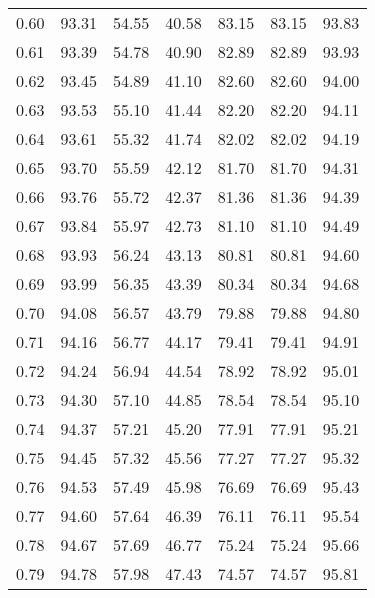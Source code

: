 \begin{tabular}{|c|c|c|c|c|c|c|}
      0.60 &     93.31 &     54.55 &      40.58 &   83.15 &      83.15 &         93.83 \\
      0.61 &     93.39 &     54.78 &      40.90 &   82.89 &      82.89 &         93.93 \\
      0.62 &     93.45 &     54.89 &      41.10 &   82.60 &      82.60 &         94.00 \\
      0.63 &     93.53 &     55.10 &      41.44 &   82.20 &      82.20 &         94.11 \\
      0.64 &     93.61 &     55.32 &      41.74 &   82.02 &      82.02 &         94.19 \\
      0.65 &     93.70 &     55.59 &      42.12 &   81.70 &      81.70 &         94.31 \\
      0.66 &     93.76 &     55.72 &      42.37 &   81.36 &      81.36 &         94.39 \\
      0.67 &     93.84 &     55.97 &      42.73 &   81.10 &      81.10 &         94.49 \\
      0.68 &     93.93 &     56.24 &      43.13 &   80.81 &      80.81 &         94.60 \\
      0.69 &     93.99 &     56.35 &      43.39 &   80.34 &      80.34 &         94.68 \\
      0.70 &     94.08 &     56.57 &      43.79 &   79.88 &      79.88 &         94.80 \\
      0.71 &     94.16 &     56.77 &      44.17 &   79.41 &      79.41 &         94.91 \\
      0.72 &     94.24 &     56.94 &      44.54 &   78.92 &      78.92 &         95.01 \\
      0.73 &     94.30 &     57.10 &      44.85 &   78.54 &      78.54 &         95.10 \\
      0.74 &     94.37 &     57.21 &      45.20 &   77.91 &      77.91 &         95.21 \\
      0.75 &     94.45 &     57.32 &      45.56 &   77.27 &      77.27 &         95.32 \\
      0.76 &     94.53 &     57.49 &      45.98 &   76.69 &      76.69 &         95.43 \\
      0.77 &     94.60 &     57.64 &      46.39 &   76.11 &      76.11 &         95.54 \\
      0.78 &     94.67 &     57.69 &      46.77 &   75.24 &      75.24 &         95.66 \\
      0.79 &     94.78 &     57.98 &      47.43 &   74.57 &      74.57 &         95.81 \\

\end{tabular}
